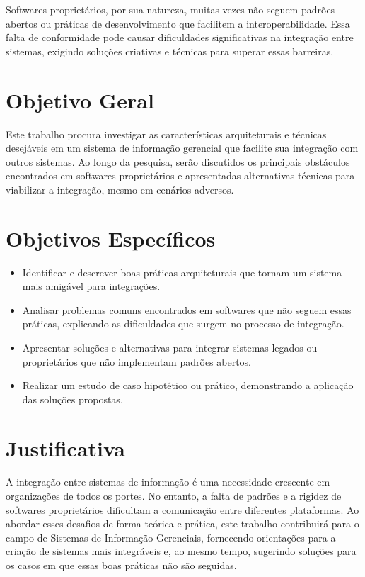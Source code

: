 \documentclass[12pt, a4paper, onecolumn]{exam}
\begin{document}
Softwares proprietários, por sua natureza, muitas vezes não seguem padrões abertos ou práticas de desenvolvimento que facilitem a interoperabilidade. Essa falta de conformidade pode causar dificuldades significativas na integração entre sistemas, exigindo soluções criativas e técnicas para superar essas barreiras.

\section{Objetivo Geral}

Este trabalho procura investigar as características arquiteturais e técnicas desejáveis em um sistema de informação gerencial que facilite sua integração com outros sistemas. Ao longo da pesquisa, serão discutidos os principais obstáculos encontrados em softwares proprietários e apresentadas alternativas técnicas para viabilizar a integração, mesmo em cenários adversos.

\section{Objetivos Específicos}

\begin{itemize}
    \item Identificar e descrever boas práticas arquiteturais que tornam um sistema mais amigável para integrações.

    \item Analisar problemas comuns encontrados em softwares que não seguem essas práticas, explicando as dificuldades que surgem no processo de integração.

    \item Apresentar soluções e alternativas para integrar sistemas legados ou proprietários que não implementam padrões abertos.

    \item Realizar um estudo de caso hipotético ou prático, demonstrando a aplicação das soluções propostas.

\end{itemize}

\section{Justificativa}

A integração entre sistemas de informação é uma necessidade crescente em organizações de todos os portes. No entanto, a falta de padrões e a rigidez de softwares proprietários dificultam a comunicação entre diferentes plataformas. Ao abordar esses desafios de forma teórica e prática, este trabalho contribuirá para o campo de Sistemas de Informação Gerenciais, fornecendo orientações para a criação de sistemas mais integráveis e, ao mesmo tempo, sugerindo soluções para os casos em que essas boas práticas não são seguidas.
\end{document}
